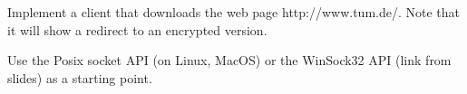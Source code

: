 \begin{task}
  Implement a client that downloads the web page http://www.tum.de/. Note that it will show a redirect to
  an encrypted version.

  Use the Posix socket API (on Linux, MacOS) or the WinSock32 API (link from slides) as a starting point.
  
\end{task}
